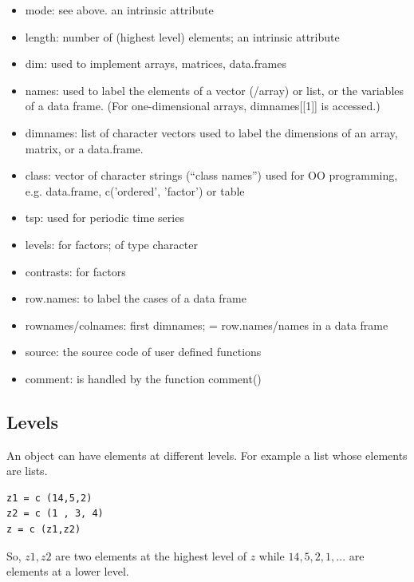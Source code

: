 \begin{itemize}
\item mode: see above. an intrinsic attribute

\item length: number of (highest level) elements; an intrinsic
  attribute

\item dim: used to implement arrays, matrices, data.frames

\item names: used to label the elements of a vector (/array) or list,
  or the variables of a data frame. (For one-dimensional arrays,
  dimnames[[1]] is accessed.)

\item dimnames: list of character vectors used to label the dimensions
  of an array, matrix, or a data.frame.

\item class: vector of character strings (``class names'') used for OO
  programming, e.g.  data.frame, c('ordered', 'factor') or table

\item  tsp: used for periodic time series

\item levels: for factors; of type character

\item  contrasts: for factors

\item  row.names: to label the cases of a data frame

\item  rownames/colnames: first dimnames; = row.names/names in a data frame

\item source: the source code of user defined functions

\item comment: is handled by the function comment()

\end{itemize}

\subsection{Levels}
\label{sec:levels}

An object can have elements at different levels. For example a list
whose elements are lists.
\begin{lstlisting}
z1 = c (14,5,2)
z2 = c (1 , 3, 4)
z = c (z1,z2)
\end{lstlisting}
So, $z1,z2$ are two elements at the highest level of $z$ while
$14,5,2,1,...$ are elements at a lower level.

